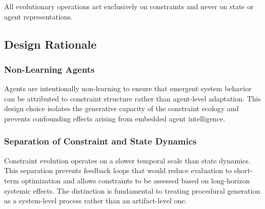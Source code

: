 All evolutionary operations act exclusively on constraints and never on state or agent representations.

\subsection{Design Rationale}

\subsubsection{Non-Learning Agents}

Agents are intentionally non-learning to ensure that emergent system behavior can be attributed to constraint structure rather than agent-level adaptation. This design choice isolates the generative capacity of the constraint ecology and prevents confounding effects arising from embedded agent intelligence.

\subsubsection{Separation of Constraint and State Dynamics}

Constraint evolution operates on a slower temporal scale than state dynamics. This separation prevents feedback loops that would reduce evaluation to short-term optimization and allows constraints to be assessed based on long-horizon systemic effects. The distinction is fundamental to treating procedural generation as a system-level process rather than an artifact-level one.
